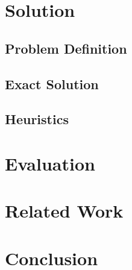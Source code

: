 \documentclass[sigplan,10pt,review,anonymous]{acmart}\settopmatter{printfolios=true}
\begin{document}
\section{Solution}
\label{sec:sol}

\subsection{Problem Definition}
\label{sub:prob}

\subsection{Exact Solution}
\label{sub:exact}

\subsection{Heuristics}
\label{sub:heu}

\section{Evaluation}
\label{sec:eval}

\section{Related Work}
\label{sec:rw}

\section{Conclusion}
\label{sec:conc}


%

\end{document}
